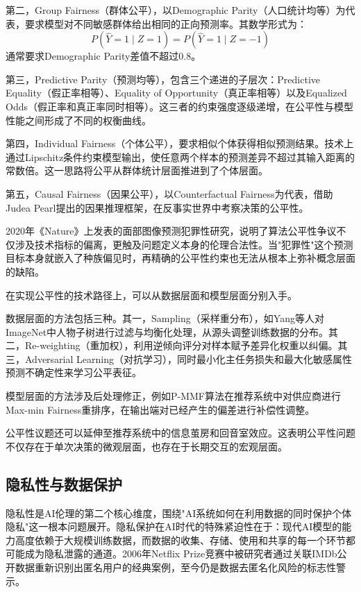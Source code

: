 \documentclass[12pt,a4paper]{ctexart}
\begin{document}
第二，Group Fairness（群体公平），以Demographic Parity（人口统计均等）为代表，要求模型对不同敏感群体给出相同的正向预测率。其数学形式为：
\[
P(\hat{Y}=1 \mid Z=1) = P(\hat{Y}=1 \mid Z=-1)
\]
通常要求Demographic Parity差值不超过0.8。

第三，Predictive Parity（预测均等），包含三个递进的子层次：Predictive Equality（假正率相等）、Equality of Opportunity（真正率相等）以及Equalized Odds（假正率和真正率同时相等）。这三者的约束强度逐级递增，在公平性与模型性能之间形成了不同的权衡曲线。

第四，Individual Fairness（个体公平），要求相似个体获得相似预测结果。技术上通过Lipschitz条件约束模型输出，使任意两个样本的预测差异不超过其输入距离的常数倍。这一思路将公平从群体统计层面推进到了个体层面。

第五，Causal Fairness（因果公平），以Counterfactual Fairness为代表，借助Judea Pearl提出的因果推理框架，在反事实世界中考察决策的公平性。

2020年《Nature》上发表的面部图像预测犯罪性研究，说明了算法公平性争议不仅涉及技术指标的偏离，更触及问题定义本身的伦理合法性。当"犯罪性"这个预测目标本身就嵌入了种族偏见时，再精确的公平性约束也无法从根本上弥补概念层面的缺陷。

在实现公平性的技术路径上，可以从数据层面和模型层面分别入手。

数据层面的方法包括三种。其一，Sampling（采样重分布），如Yang等人对ImageNet中人物子树进行过滤与均衡化处理，从源头调整训练数据的分布。其二，Re-weighting（重加权），利用逆倾向评分对样本赋予差异化权重以纠偏。其三，Adversarial Learning（对抗学习），同时最小化主任务损失和最大化敏感属性预测不确定性来学习公平表征。

模型层面的方法涉及后处理修正，例如P-MMF算法在推荐系统中对供应商进行Max-min Fairness重排序，在输出端对已经产生的偏差进行补偿性调整。

公平性议题还可以延伸至推荐系统中的信息茧房和回音室效应。这表明公平性问题不仅存在于单次决策的微观层面，也存在于长期交互的宏观层面。

\subsection{隐私性与数据保护}

隐私性是AI伦理的第二个核心维度，围绕"AI系统如何在利用数据的同时保护个体隐私"这一根本问题展开。隐私保护在AI时代的特殊紧迫性在于：现代AI模型的能力高度依赖于大规模训练数据，而数据的收集、存储、使用和共享的每一个环节都可能成为隐私泄露的通道。2006年Netflix Prize竞赛中被研究者通过关联IMDb公开数据重新识别出匿名用户的经典案例，至今仍是数据去匿名化风险的标志性警示。
\end{document}
